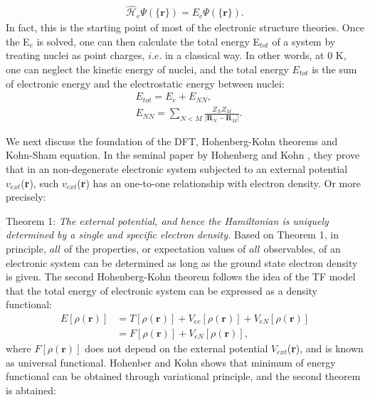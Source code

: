 	\begin{equation}
	\begin{aligned}
        \hat{\mathcal{H}}_e \Psi(\{\textbf{r}\})=E_e \Psi(\{\textbf{r}\}).
    \end{aligned}
	\end{equation}
In fact, this is the starting point of most of the electronic structure theories. Once the E$_e$ is solved, one can then calculate the total energy E$_{tot}$ of a system by treating nuclei as point charges, $i.e.$ in a classical way. In other words, at 0 K, one can neglect the kinetic energy of nuclei, and the total energy $E_{tot}$ is the sum of electronic energy and the electrostatic energy between nuclei:
	\begin{equation}
	\begin{aligned}
	    & E_{tot} = E_e + E_{NN}, \\
        & E_{NN} = \sum_{N<M} \frac{Z_NZ_M}{\left| \textbf{R}_N-\textbf{R}_M \right|}.
    \end{aligned}
	\end{equation}

We next discuss the foundation of the DFT, Hohenberg-Kohn theorems and Kohn-Sham equation. In the seminal paper by Hohenberg and Kohn \cite{DFT_1}, they prove that in an non-degenerate electronic system subjected to an external potential $v_{ext}$(\textbf{r}), such $v_{ext}$(\textbf{r}) has an one-to-one relationship with electron density. Or more precisely: \newline

	{Theorem 1:
	  \textit{The external potential, and hence the Hamiltonian is uniquely  \\ 
	  \vspace{0pt}  \hspace{74pt} determined by a single and specific electron density.}
	  \singlespacing
	 }
Based on Theorem 1, in principle, $all$ of the properties, or expectation values of $all$ observables, of an electronic system can be determined as long as the ground state electron density is given. The second Hohenberg-Kohn theorem follows the idea of the TF model that the total energy of electronic system can be expressed as a density functional:
	\begin{equation}
		\label{eq:hk}
		\begin{aligned}
			E[\rho(\textbf{r})] &= T[\rho(\textbf{r})] + V_{ee}[\rho(\textbf{r})] +V_{eN}[\rho(\textbf{r})] \\
			& = F[\rho(\textbf{r})] +V_{eN}[\rho(\textbf{r})],
		\end{aligned}
	\end{equation}
where $F[\rho(\textbf{r})]$ does not depend on the external potential $V_{ext}$(\textbf{r}), and is known as universal functional. Hohenber and Kohn shows that minimum of energy functional can be obtained through variational principle, and the second theorem is abtained:\newline

